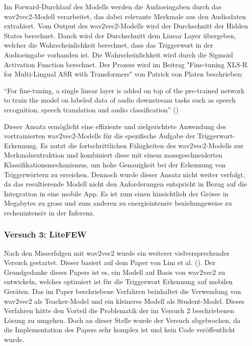 \documentclass[11pt,a4paper]{article}
\begin{document}
\noindent \newline
Im Forward-Durchlauf des Modells werden die Audioeingaben durch das wav2vec2-Modell verarbeitet, 
das dabei relevante Merkmale aus den Audiodaten extrahiert. Vom Output des wav2vec2-Modells wird 
der Durchschnitt der Hidden States berechnet. Danch wird der Durchschnitt dem Linear Layer 
übergeben, welcher die Wahrscheinlichkeit berechnet, dass das Triggerwort in der Audioeingabe
vorhanden ist. Die Wahrscheinlichkeit wird durch die Sigmoid Activation Function berechnet. Der 
Prozess wird im Beitrag "Fine-tuning XLS-R for Multi-Lingual ASR with Transformers" von Patrick 
von Platen beschrieben:

\begin{displayquote}
	``For fine-tuning, a single linear layer is added on top of the pre-trained network to train 
	the model on labeled data of audio downstream tasks such as speech recognition, speech 
	translation and audio classification'' 
	(\cite{platen2021finetune})
\end{displayquote}

\noindent \newline
Dieser Ansatz ermöglicht eine effiziente und zielgerichtete Anwendung des vortrainierten 
wav2vec2-Modells für die spezifische Aufgabe der Triggerwort-Erkennung. Es nutzt die 
fortschrittlichen Fähigkeiten des wav2vec2-Modells zur Merkmalsextraktion und kombiniert 
diese mit einem massgeschneiderten Klassifikationsmechanismus, um hohe Genauigkeit bei der 
Erkennung von Triggerwörtern zu erreichen. Dennoch wurde dieser Ansatz nicht weiter verfolgt, da 
das resultierende Modell nicht den Anforderungen entspricht in Bezug auf die Integration in eine 
mobile App. Es ist zum einen hinsichtlich der Grösse in Megabytes zu gross und zum anderen zu 
energieintensiv beziehungsweise zu rechenintensiv in der Inferenz. 



\subsubsection{Versuch 3: LiteFEW}
Nach den Misserfolgen mit wav2vec2 wurde ein weiterer vielversprechender Versuch gestartet. Dieser 
basiert auf dem Paper von Lim et al. (\cite{lim2023lightweight}). Der Grundgedanke dieses Papers 
ist es, ein Modell auf Basis von wav2vec2 zu entwickeln, welches optimiert ist für die Triggerwort 
Erkennung auf mobilen Geräten. Das im Paper beschriebene Verfahren beinhaltet die Verwendung von 
wav2vec2 als Teacher-Model und ein kleineres Modell als Student-Model. Dieses Verfahren hätte 
den Vorteil die Problematik der im Versuch 2 beschriebenen Lösung zu umgehen. Doch an dieser Stelle 
wurde der Versuch abgebrochen, da die Implementation des Papers sehr komplex ist und kein Code 
veröffentlicht wurde.
\end{document}
